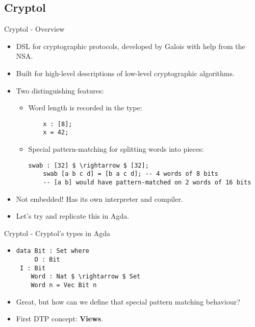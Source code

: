 \documentclass[10pt]{beamer}
\begin{document}
\subsection{Cryptol}
\begin{frame}[fragile]{Cryptol - Overview}

\begin{itemize}
\item DSL for cryptographic protocols, developed by Galois with help from the NSA.
\item Built for high-level descriptions of low-level cryptographic algorithms.
\item Two distinguishing features:
	\begin{itemize}
	\item Word length is recorded in the type:
	\begin{lstlisting}
	x : [8];
	x = 42;
	\end{lstlisting}
	\item Special pattern-matching for splitting words into pieces:
	\begin{lstlisting}[mathescape=true]
	swab : [32] $ \rightarrow $ [32];
	swab [a b c d] = [b a c d]; -- 4 words of 8 bits
	-- [a b] would have pattern-matched on 2 words of 16 bits
	\end{lstlisting}
	\end{itemize}
\item Not embedded! Has its own interpreter and compiler.
\item Let's try and replicate this in Agda.
\end{itemize}

\end{frame}

\begin{frame}[fragile]{Cryptol - Cryptol's types in Agda}
\begin{itemize}
\item 
	\begin{lstlisting}[mathescape=true]
	data Bit : Set where
	 O : Bit
 I : Bit
	Word : Nat $ \rightarrow $ Set
	Word n = Vec Bit n
	\end{lstlisting}
\item Great, but how can we define that special pattern matching behaviour?
\item First DTP concept: \textbf{Views}.
\end{itemize}
\end{frame}
\end{document}
